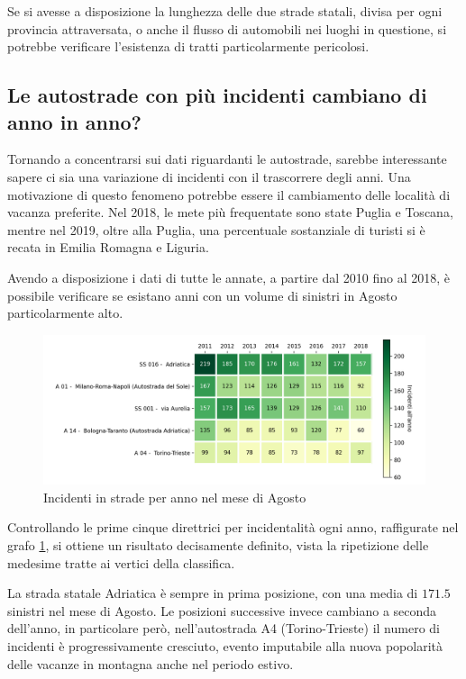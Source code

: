 \documentclass[a4paper,12pt]{report}
\begin{document}
Se si avesse a disposizione la lunghezza delle due strade statali, 
divisa per ogni provincia attraversata,
o anche il flusso di automobili nei luoghi in questione, 
si potrebbe verificare l'esistenza di tratti particolarmente pericolosi. 

\subsection{Le autostrade con più incidenti cambiano di anno in anno?}

Tornando a concentrarsi sui dati riguardanti le autostrade, 
sarebbe interessante sapere ci sia una variazione di incidenti con il trascorrere degli anni. 
Una motivazione di questo fenomeno potrebbe essere il cambiamento 
delle località di vacanza preferite. 
Nel 2018, le mete più frequentate sono state Puglia e 
Toscana\cite{INFOGRAFICA_ISTAT:1}, mentre nel 2019, oltre alla Puglia, 
una percentuale sostanziale di turisti si è recata in 
Emilia Romagna e Liguria\cite{REPORT_ISTAT_2019:1}. 

Avendo a disposizione i dati di tutte le annate, a partire dal 2010 fino al 2018, 
è possibile verificare se esistano anni con un volume di 
sinistri in Agosto particolarmente alto. 

\begin{figure}
    \includegraphics[width=\linewidth]{../src/incidenti/incidenti_aci/agosto/vacanze_autostrade.png}
    \caption{Incidenti in strade per anno nel mese di Agosto}
    \label{fig:autostrade-anno}
\end{figure}

Controllando le prime cinque direttrici per incidentalità ogni anno, 
raffigurate nel grafo \ref{fig:autostrade-anno}, si ottiene 
un risultato decisamente definito, vista la ripetizione delle medesime 
tratte ai vertici della classifica.

La strada statale Adriatica è sempre in prima posizione, con una media di $171.5$ 
sinistri nel mese di Agosto. 
Le posizioni successive invece cambiano a seconda dell'anno, in particolare però, 
nell'autostrada A4 (Torino-Trieste) il numero di incidenti è progressivamente cresciuto, 
evento imputabile alla nuova popolarità delle vacanze in montagna anche nel periodo estivo. 
\end{document}
